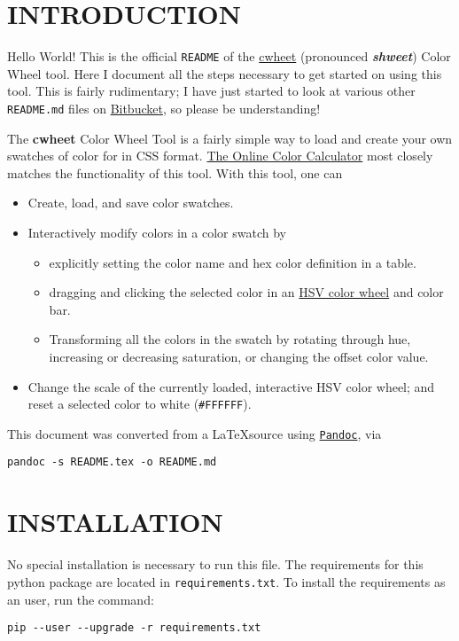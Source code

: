 \documentclass[]{article}
\author{Tanim Islam}
\date{\today}
\begin{document}
\section{INTRODUCTION}\label{introduction}

Hello World! This is the official \texttt{README} of the
\href{https://bitbucket.org/tanim_islam/cwheet}{cwheet} (pronounced
\textit{\textbf{shweet}}) Color Wheel tool. Here I document all the
steps necessary to get started on using this tool. This is fairly
rudimentary; I have just started to look at various other
\texttt{README.md} files on \href{https://bitbucket.org}{Bitbucket},
so please be understanding!

The \textbf{cwheet} Color Wheel Tool is a fairly simple way to load
and create your own swatches of color for in CSS
format. \href{http://www.sessions.edu/color-calculator}{The Online
 Color Calculator} most closely matches the functionality of this
tool. With this tool, one can
\begin{itemize}
  \item Create, load, and save color swatches.
  \item Interactively modify colors in a color swatch by
    \begin{itemize}
      \item explicitly setting the color name and hex color definition
        in a table.
      \item dragging and clicking the selected color in an
        \href{https://en.wikipedia.org/wiki/HSL_and_HSV}{HSV color
          wheel} and color bar.        
        \item Transforming all the colors in the swatch by rotating
          through hue, increasing or decreasing saturation, or
          changing the offset color value.
    \end{itemize}
  \item Change the scale of the currently loaded, interactive HSV
    color wheel; and reset a selected color to white
    (\texttt{\#FFFFFF}). 
\end{itemize}

This document was converted from a \LaTeX source using
\href{http://pandoc.org/index.html}{\texttt{Pandoc}}, via
\begin{verbatim}
pandoc -s README.tex -o README.md
\end{verbatim}

\section{INSTALLATION}\label{installation}
No special installation is necessary to run this file. The
requirements for this python package are located in
\texttt{requirements.txt}. To install the requirements as an user, run
the command:
\begin{verbatim}
pip --user --upgrade -r requirements.txt
\end{verbatim}
\end{document}
